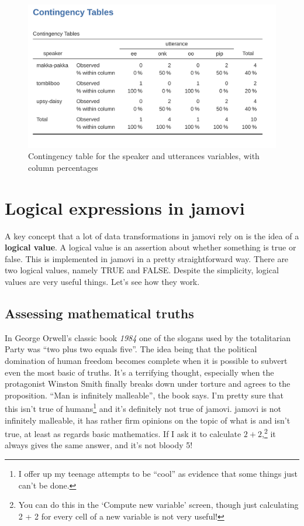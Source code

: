 \documentclass[
  a4paper,
]{book}
\begin{document}
\begin{figure}

\includegraphics[width=1\textwidth,height=\textheight]{images/fig6-3.png} \hfill{}

\caption{\label{fig-fig6-3}Contingency table for the speaker and
utterances variables, with column percentages}

\end{figure}

\hypertarget{logical-expressions-in-jamovi}{%
\section{Logical expressions in
jamovi}\label{logical-expressions-in-jamovi}}

A key concept that a lot of data transformations in jamovi rely on is
the idea of a \textbf{logical value}. A logical value is an assertion
about whether something is true or false. This is implemented in jamovi
in a pretty straightforward way. There are two logical values, namely
TRUE and FALSE. Despite the simplicity, logical values are very useful
things. Let's see how they work.

\hypertarget{assessing-mathematical-truths}{%
\subsection{Assessing mathematical
truths}\label{assessing-mathematical-truths}}

In George Orwell's classic book \emph{1984} one of the slogans used by
the totalitarian Party was ``two plus two equals five''. The idea being
that the political domination of human freedom becomes complete when it
is possible to subvert even the most basic of truths. It's a terrifying
thought, especially when the protagonist Winston Smith finally breaks
down under torture and agrees to the proposition. ``Man is infinitely
malleable'', the book says. I'm pretty sure that this isn't true of
humans\footnote{I offer up my teenage attempts to be ``cool'' as
  evidence that some things just can't be done.} and it's definitely not
true of jamovi. jamovi is not infinitely malleable, it has rather firm
opinions on the topic of what is and isn't true, at least as regards
basic mathematics. If I ask it to calculate \(2 + 2\),\footnote{You can
  do this in the `Compute new variable' screen, though just calculating
  2 + 2 for every cell of a new variable is not very useful!} it always
gives the same answer, and it's not bloody 5!
\end{document}
